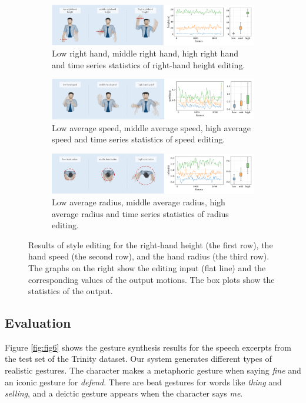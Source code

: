 \begin{figure}[t]
    \centering
    \begin{subfigure}[t]{\textwidth}
        \centering
        \includegraphics[width=\textwidth]{figures/fig7a.pdf}
        \caption{Low right hand, middle right hand, high right hand and time series statistics of right-hand height editing.}
        \label{fig:fig7a}
    \end{subfigure}
    \begin{subfigure}[t]{\textwidth}
        \centering
        \includegraphics[width=\textwidth]{figures/fig7b.pdf}
        \caption{Low average speed, middle average speed, high average speed and time series statistics of speed editing.}
        \label{fig:fig7b}
    \end{subfigure}
    \begin{subfigure}[t]{\textwidth}
        \centering
        \includegraphics[width=\textwidth]{figures/fig7c.pdf}
        \caption{Low average radius, middle average radius, high average radius and time series statistics of radius editing.}
        \label{fig:fig7c}
    \end{subfigure}
    \caption{Results of style editing for the right-hand height (the first row), the hand speed (the second row), and the hand radius (the third row). The graphs on the right show the editing input (flat line) and the corresponding values of the output motions. The box plots show the statistics of the output.}
    \label{fig:fig7}
    \Description{}
\end{figure}

\subsection{Evaluation}
\label{subsec:evaluation}
Figure \ref{fig:fig6} shows the gesture synthesis results for the speech excerpts from the test set of the Trinity dataset. Our system generates different types of realistic gestures. The character makes a metaphoric gesture when saying \emph{fine} and an iconic gesture for \emph{defend}. There are beat gestures for words like \emph{thing} and \emph{selling}, and a deictic gesture appears when the character says \emph{me}.

